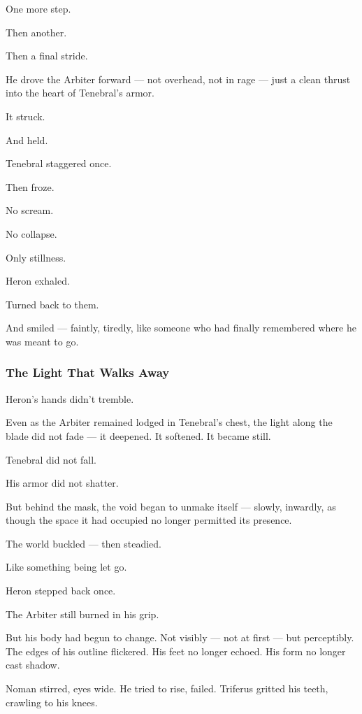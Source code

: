\documentclass[12pt]{article}
\begin{document}
One more step.

Then another.

Then a final stride.

He drove the Arbiter forward — not overhead, not in rage — just a clean thrust into the heart of Tenebral’s armor.

It struck.

And held.

\bigskip

Tenebral staggered once.

Then froze.

No scream.

No collapse.

Only stillness.

Heron exhaled.

Turned back to them.

And smiled — faintly, tiredly, like someone who had finally remembered where he was meant to go.

\dotfill

\subsubsection*{The Light That Walks Away}

Heron’s hands didn’t tremble.

Even as the Arbiter remained lodged in Tenebral’s chest, the light along the blade did not fade — it deepened. It softened. It became still.

Tenebral did not fall.

His armor did not shatter.

But behind the mask, the void began to unmake itself — slowly, inwardly, as though the space it had occupied no longer permitted its presence.

The world buckled — then steadied.

Like something being let go.

\bigskip

Heron stepped back once.

The Arbiter still burned in his grip.

But his body had begun to change. Not visibly — not at first — but perceptibly. The edges of his outline flickered. His feet no longer echoed. His form no longer cast shadow.

Noman stirred, eyes wide. He tried to rise, failed. Triferus gritted his teeth, crawling to his knees.

\bigskip
\end{document}
